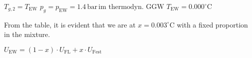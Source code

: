 \( T_{g,2} = T_{\text{EW}} \)  
\( p_g = p_{\text{EW}} = 1.4 \, \text{bar} \, \text{im thermodyn. GGW} \)  
\( T_{\text{EW}} = 0.000^\circ \text{C} \)  

From the table, it is evident that we are at \( x = 0.003^\circ \text{C} \) with a fixed proportion in the mixture.  

\( U_{\text{EW}} = (1 - x) \cdot U_{\text{FL}} + x \cdot U_{\text{Fest}} \)
